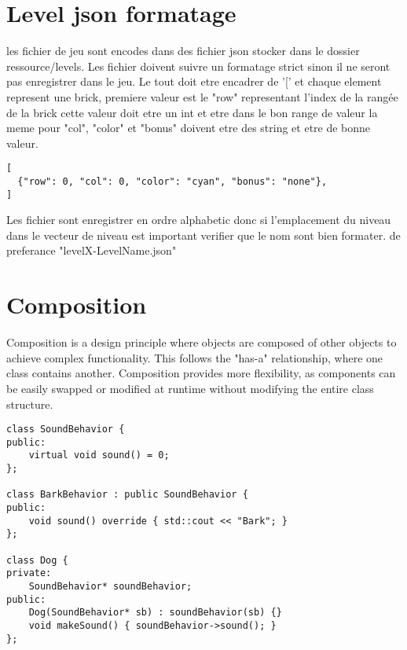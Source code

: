 \documentclass{article}
\begin{document}
\section{Level json formatage}
les fichier de jeu sont encodes dans des fichier json stocker dans le dossier ressource/levels. Les fichier doivent suivre un formatage strict sinon il ne seront pas enregistrer dans le jeu. Le tout doit etre encadrer de '[' et chaque element represent une brick, premiere valeur est le "row" representant l'index de la rangée de la brick cette valeur doit etre un int et etre dans le bon range de valeur la meme pour "col", "color" et "bonus" doivent etre des string et etre de bonne valeur. 
\begin{center}
    \begin{minipage}[c]{0.5\textwidth}
        \begin{verbatim}
[
  {"row": 0, "col": 0, "color": "cyan", "bonus": "none"},
]
        \end{verbatim}
    \end{minipage}
\end{center}
Les fichier sont enregistrer en ordre alphabetic donc si l'emplacement du niveau dans le vecteur de niveau est important verifier que le nom sont bien formater.
de preferance "levelX-LevelName.json"

\section{Composition}
Composition is a design principle where objects are composed of other objects to achieve complex functionality. This follows the "has-a" relationship, where one class contains another. Composition provides more flexibility, as components can be easily swapped or modified at runtime without modifying the entire class structure.


\begin{center}
    \begin{minipage}[c]{0.5\textwidth}
        \begin{verbatim}
class SoundBehavior {
public:
    virtual void sound() = 0;
};

class BarkBehavior : public SoundBehavior {
public:
    void sound() override { std::cout << "Bark"; }
};

class Dog {
private:
    SoundBehavior* soundBehavior;
public:
    Dog(SoundBehavior* sb) : soundBehavior(sb) {}
    void makeSound() { soundBehavior->sound(); }
};
        \end{verbatim}
    \end{minipage}
\end{center}
\end{document}
